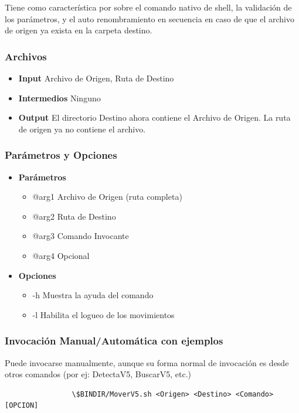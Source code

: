 \documentclass[a4paper,10pt,titlepage]{article}
\begin{document}
			Tiene como caracter\'istica por sobre el comando nativo de shell, la validaci\'on de los par\'ametros, y el auto renombramiento en secuencia en caso de que el archivo de origen ya exista en la carpeta destino.

		\subsubsection{Archivos}
			\begin {itemize}
				\item \textbf{Input } {Archivo de Origen, Ruta de Destino}
				\item \textbf{Intermedios } {Ninguno}
				\item \textbf{Output } {El directorio Destino ahora contiene el Archivo de Origen. La ruta de origen ya no contiene el archivo.}
			\end{itemize}

		\subsubsection{Par\'ametros y Opciones}
			\begin {itemize}
				\item \textbf{Par\'ametros} {
					\begin{itemize}
						\item {@arg1 }{Archivo de Origen (ruta completa)} 
						\item {@arg2 }{Ruta de Destino } 
						\item {@arg3 }{Comando Invocante} 
						\item {@arg4 }{Opcional} 
					\end{itemize}
				}
				\item \textbf{Opciones}{
					\begin{itemize}
						\item {-h }{Muestra la ayuda del comando} 
						\item {-l }{Habilita el logueo de los movimientos} 
					\end{itemize}
				}
			\end{itemize}
	
		\subsubsection{Invocaci\'on Manual/Autom\'atica con ejemplos}
			Puede invocarse manualmente, aunque su forma normal de invocaci\'on es desde otros comandos (por ej: DetectaV5, BuscarV5, etc.)
			\begin{verbatim}
				\$BINDIR/MoverV5.sh <Origen> <Destino> <Comando> [OPCION]
			\end{verbatim}
\end{document}
